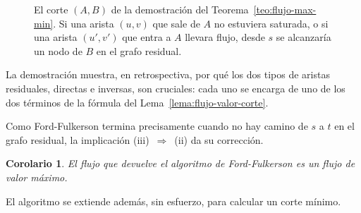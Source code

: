 \documentclass[12pt, spanish, oneside, openany]{book}
\theoremstyle{uprightplain}
\newtheorem{corolario}[teorema]{Corolario}
\theoremstyle{definition}
\theoremstyle{remark}
\theoremstyle{definition}
\begin{document}
\begin{figure}[H]
\centering
{}
\caption{El corte $(A,B)$ de la demostración del Teorema~\ref{teo:flujo-max-min}.
Si una arista $(u,v)$ que sale de $A$ no estuviera saturada, o si una arista
$(u',v')$ que entra a $A$ llevara flujo, desde $s$ se alcanzaría un nodo de $B$
en el grafo residual.}
\label{fig:flujo-corte-residual}
\end{figure}

La demostración muestra, en retrospectiva, por qué los dos tipos de aristas residuales, directas e inversas, son cruciales: cada uno se encarga de uno de los dos términos de la fórmula del Lema~\ref{lema:flujo-valor-corte}.

Como Ford-Fulkerson termina precisamente cuando no hay camino de $s$ a $t$ en el grafo residual, la implicación (iii)~$\Rightarrow$~(ii) da su corrección.

\begin{corolario}
\label{cor:flujo-ff-correcto}
El flujo que devuelve el algoritmo de Ford-Fulkerson es un flujo de valor máximo.
\end{corolario}

El algoritmo se extiende además, sin esfuerzo, para calcular un corte mínimo.
\end{document}
